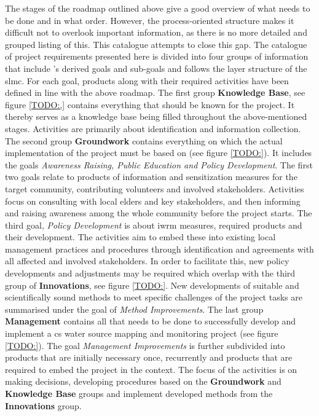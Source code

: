 The stages of the roadmap outlined above give a good overview of what needs to be done and in what order. However, the process-oriented structure makes it difficult not to overlook important information, as there is no more detailed and grouped listing of this. This catalogue attempts to close this gap. The catalogue of project requirements presented here is divided into four groups of information that include \autocite{minkmanCitizenScienceWater2015}'s derived goals and sub-goals and follows the layer structure of the \acrshort{slmc}. For each goal, products along with their required activities have been defined in line with the above roadmap. \newline
The first group \textbf{Knowledge Base}, see figure \ref*{TODO:,} contains everything that should be known for the project. It thereby serves as a knowledge base being filled throughout the above-mentioned stages. Activities are primarily about identification and information collection. The second group \textbf{Groundwork} contains everything on which the actual implementation of the project must be based on (see figure \ref*{TODO:}). It includes the goals \textit{Awareness Raising, Public Education and Policy Development}. The first two goals relate to products of information and sensitization measures for the target community, contributing volunteers and involved stakeholders. Activities focus on consulting with local elders and key stakeholders, and then informing and raising awareness among the whole community before the project starts. The third goal, \textit{Policy Development} is about \acrshort{iwrm} measures, required products and their development. The activities aim to embed these into existing local management practices and procedures through identification and agreements with all affected and involved stakeholders. In order to facilitate this, new policy developments and adjustments may be required which overlap with the third group of \textbf{Innovations}, see figure \ref*{TODO:}. New developments of suitable and scientifically sound methods to meet specific challenges of the project tasks are summarised under the goal of \textit{Method Improvements}. The last group \textbf{Management} contains all that needs to be done to successfully develop and implement a \acrshort{cs} water source mapping and monitoring project (see figure \ref*{TODO:}). The goal \textit{Management Improvements} is further subdivided into products that are initially necessary once, recurrently and products that are required to embed the project in the context. The focus of the activities is on making decisions, developing procedures based on the \textbf{Groundwork} and \textbf{Knowledge Base} groups and implement developed methods from the \textbf{Innovations} group.\newline

